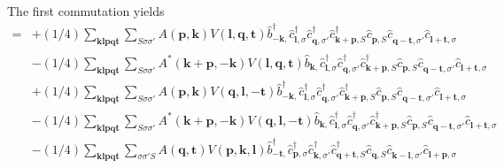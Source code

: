 The first commutation yields
\begin{align*}
	[\eta, H_\mathrm{C}] = 	&+(1/4) \sum_{ \mathbf{k} \mathbf{l} \mathbf{p} \mathbf{q} \mathbf{t} } \sum_{ S \sigma \sigma' } A( \mathbf{p}, \mathbf{k} )  V( \mathbf{l}, \mathbf{q}, \mathbf{t} )   \hat{b}_{ -\mathbf{k}, }^\dagger  \hat{c}_{ \mathbf{l}, \sigma }^\dagger  \hat{c}_{ \mathbf{q}, \sigma' }^\dagger  \hat{c}_{ \mathbf{k}+\mathbf{p}, S }^\dagger  \hat{c}_{ \mathbf{p}, S }^{\phantom{\dagger}} \hat{c}_{ \mathbf{q}-\mathbf{t}, \sigma' }^{\phantom{\dagger}} \hat{c}_{ \mathbf{l}+\mathbf{t}, \sigma }^{\phantom{\dagger}}  \\
	&-(1/4) \sum_{ \mathbf{k} \mathbf{l} \mathbf{p} \mathbf{q} \mathbf{t} } \sum_{ S \sigma \sigma' } A^*( \mathbf{k}+\mathbf{p}, -\mathbf{k} )  V( \mathbf{l}, \mathbf{q}, \mathbf{t} )   \hat{b}_{ \mathbf{k}, }^{\phantom{\dagger}} \hat{c}_{ \mathbf{l}, \sigma }^\dagger  \hat{c}_{ \mathbf{q}, \sigma' }^\dagger  \hat{c}_{ \mathbf{k}+\mathbf{p}, S }^\dagger  \hat{c}_{ \mathbf{p}, S }^{\phantom{\dagger}} \hat{c}_{ \mathbf{q}-\mathbf{t}, \sigma' }^{\phantom{\dagger}} \hat{c}_{ \mathbf{l}+\mathbf{t}, \sigma }^{\phantom{\dagger}}  \\
	&+(1/4) \sum_{ \mathbf{k} \mathbf{l} \mathbf{p} \mathbf{q} \mathbf{t} } \sum_{ S \sigma \sigma' } A( \mathbf{p}, \mathbf{k} )  V( \mathbf{q}, \mathbf{l}, -\mathbf{t} )   \hat{b}_{ -\mathbf{k}, }^\dagger  \hat{c}_{ \mathbf{l}, \sigma }^\dagger  \hat{c}_{ \mathbf{q}, \sigma' }^\dagger  \hat{c}_{ \mathbf{k}+\mathbf{p}, S }^\dagger  \hat{c}_{ \mathbf{p}, S }^{\phantom{\dagger}} \hat{c}_{ \mathbf{q}-\mathbf{t}, \sigma' }^{\phantom{\dagger}} \hat{c}_{ \mathbf{l}+\mathbf{t}, \sigma }^{\phantom{\dagger}}  \\
	&-(1/4) \sum_{ \mathbf{k} \mathbf{l} \mathbf{p} \mathbf{q} \mathbf{t} } \sum_{ S \sigma \sigma' } A^*( \mathbf{k}+\mathbf{p}, -\mathbf{k} )  V( \mathbf{q}, \mathbf{l}, -\mathbf{t} )   \hat{b}_{ \mathbf{k}, }^{\phantom{\dagger}} \hat{c}_{ \mathbf{l}, \sigma }^\dagger  \hat{c}_{ \mathbf{q}, \sigma' }^\dagger  \hat{c}_{ \mathbf{k}+\mathbf{p}, S }^\dagger  \hat{c}_{ \mathbf{p}, S }^{\phantom{\dagger}} \hat{c}_{ \mathbf{q}-\mathbf{t}, \sigma' }^{\phantom{\dagger}} \hat{c}_{ \mathbf{l}+\mathbf{t}, \sigma }^{\phantom{\dagger}}  \\
	&-(1/4) \sum_{ \mathbf{k} \mathbf{l} \mathbf{p} \mathbf{q} \mathbf{t} } \sum_{ \sigma \sigma' S } A( \mathbf{q}, \mathbf{t} )  V( \mathbf{p}, \mathbf{k}, \mathbf{l} )   \hat{b}_{ -\mathbf{t}, }^\dagger  \hat{c}_{ \mathbf{p}, \sigma }^\dagger  \hat{c}_{ \mathbf{k}, \sigma' }^\dagger  \hat{c}_{ \mathbf{q}+\mathbf{t}, S }^\dagger  \hat{c}_{ \mathbf{q}, S }^{\phantom{\dagger}} \hat{c}_{ \mathbf{k}-\mathbf{l}, \sigma' }^{\phantom{\dagger}} \hat{c}_{ \mathbf{l}+\mathbf{p}, \sigma }^{\phantom{\dagger}}  \\

\end{align*}
